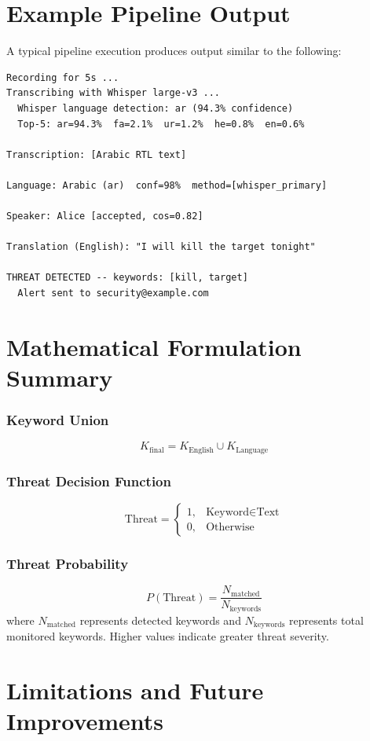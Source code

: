 \documentclass[12pt]{report}
\begin{document}
\section{Example Pipeline Output}
A typical pipeline execution produces output similar to the following:

\begin{lstlisting}
Recording for 5s ...
Transcribing with Whisper large-v3 ...
  Whisper language detection: ar (94.3% confidence)
  Top-5: ar=94.3%  fa=2.1%  ur=1.2%  he=0.8%  en=0.6%

Transcription: [Arabic RTL text]

Language: Arabic (ar)  conf=98%  method=[whisper_primary]

Speaker: Alice [accepted, cos=0.82]

Translation (English): "I will kill the target tonight"

THREAT DETECTED -- keywords: [kill, target]
  Alert sent to security@example.com
\end{lstlisting}

\section{Mathematical Formulation Summary}

\subsubsection{Keyword Union}
\[
K_{\text{final}} = K_{\text{English}} \cup K_{\text{Language}}
\]

\subsubsection{Threat Decision Function}
\[
\text{Threat} = \begin{cases} 1, & \text{Keyword} \in \text{Text} \\ 0, & \text{Otherwise} \end{cases}
\]

\subsubsection{Threat Probability}
\[
P(\text{Threat}) = \frac{N_{\text{matched}}}{N_{\text{keywords}}}
\]
where $N_{\text{matched}}$ represents detected keywords and $N_{\text{keywords}}$ represents total monitored keywords. Higher values indicate greater threat severity.

\section{Limitations and Future Improvements}
\end{document}
